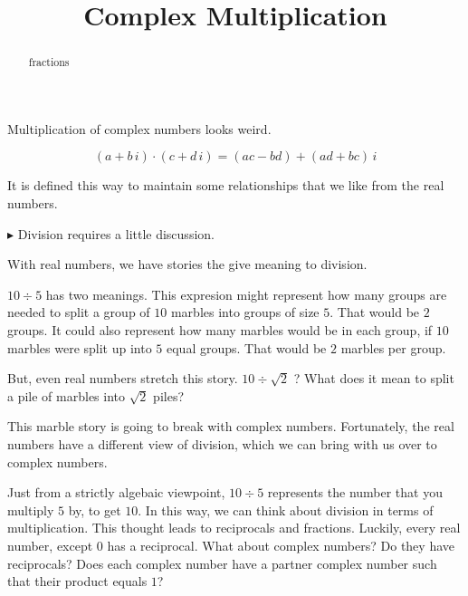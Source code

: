 \documentclass{ximera}
\title{Complex Multiplication}
\begin{document}
\begin{abstract}
fractions
\end{abstract}
\maketitle


Multiplication of complex numbers looks weird.





\begin{definition}


\[    (a + b \, i) \cdot (c + d \, i) = (ac-bd) + (ad+bc) \, i           \]

\end{definition}


It is defined this way to maintain some relationships that we like from the real numbers.



$\blacktriangleright$ Division requires a little discussion.



With real numbers, we have stories the give meaning to division.


$10 \div 5$ has two meanings.  This expresion might represent how many groups are needed to split a group of $10$ marbles into groups of size $5$.  That would be $2$ groups.  It could also represent how many marbles would be in each group, if $10$ marbles were split up into $5$ equal groups.  That would be $2$ marbles per group.


But, even real numbers stretch this story.  $10 \div \sqrt{2}$ ?  What does it mean to split a pile of marbles into $\sqrt{2}$ piles?

This marble story is going to break with complex numbers.  Fortunately, the real numbers have a different view of division, which we can bring with us over to complex numbers.





Just from a strictly algebaic viewpoint, $10 \div 5$ represents the number that you multiply $5$ by, to get $10$.  In this way, we can think about division in terms of multiplication.  This thought leads to reciprocals and fractions.  Luckily, every real number, except $0$ has a reciprocal.  What about complex numbers?  Do they have reciprocals?  Does each complex number have a partner complex number such that their product equals $1$?
\end{document}
